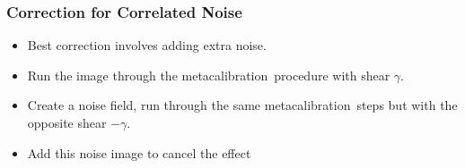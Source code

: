 \documentclass{beamer}
\newcommand{\mcal}{metacalibration}
\begin{document}
%
%
%
%


\frame
{
    \frametitle{Correction for Correlated Noise}

 
    \begin{itemize}

        \item Best correction involves adding {\color{lightskyblue} extra noise}.

        \item Run the image through the \mcal\ procedure with
            shear $\gamma$.

        \item Create a noise field, run through the same \mcal\ steps but with
            the {\color{lightskyblue} opposite shear} $-\gamma$.

        \item Add this noise image to cancel the effect

    \end{itemize}

}




\end{document}
